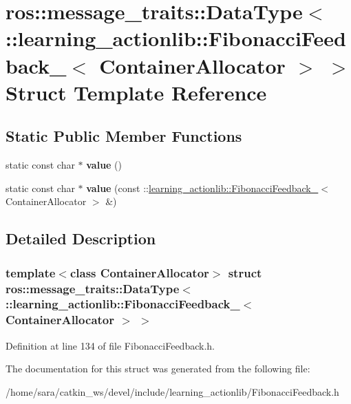 \hypertarget{structros_1_1message__traits_1_1DataType_3_01_1_1learning__actionlib_1_1FibonacciFeedback___3_01ContainerAllocator_01_4_01_4}{}\section{ros\+:\+:message\+\_\+traits\+:\+:Data\+Type$<$ \+:\+:learning\+\_\+actionlib\+:\+:Fibonacci\+Feedback\+\_\+$<$ Container\+Allocator $>$ $>$ Struct Template Reference}
\label{structros_1_1message__traits_1_1DataType_3_01_1_1learning__actionlib_1_1FibonacciFeedback___3_01ContainerAllocator_01_4_01_4}
\subsection*{Static Public Member Functions}
\begin{DoxyCompactItemize}
\item 
\mbox{\label{structros_1_1message__traits_1_1DataType_3_01_1_1learning__actionlib_1_1FibonacciFeedback___3_01ContainerAllocator_01_4_01_4_ac4ec73fcc765175cbf5126dac0c0ee48}} 
static const char $\ast$ {\bfseries value} ()
\item 
\mbox{\label{structros_1_1message__traits_1_1DataType_3_01_1_1learning__actionlib_1_1FibonacciFeedback___3_01ContainerAllocator_01_4_01_4_ac6ff41512123af98f24e3cd7c05389c5}} 
static const char $\ast$ {\bfseries value} (const \+::\hyperlink{structlearning__actionlib_1_1FibonacciFeedback__}{learning\+\_\+actionlib\+::\+Fibonacci\+Feedback\+\_\+}$<$ Container\+Allocator $>$ \&)
\end{DoxyCompactItemize}


\subsection{Detailed Description}
\subsubsection*{template$<$class Container\+Allocator$>$\newline
struct ros\+::message\+\_\+traits\+::\+Data\+Type$<$ \+::learning\+\_\+actionlib\+::\+Fibonacci\+Feedback\+\_\+$<$ Container\+Allocator $>$ $>$}



Definition at line 134 of file Fibonacci\+Feedback.\+h.



The documentation for this struct was generated from the following file\+:\begin{DoxyCompactItemize}
\item 
/home/sara/catkin\+\_\+ws/devel/include/learning\+\_\+actionlib/Fibonacci\+Feedback.\+h\end{DoxyCompactItemize}
